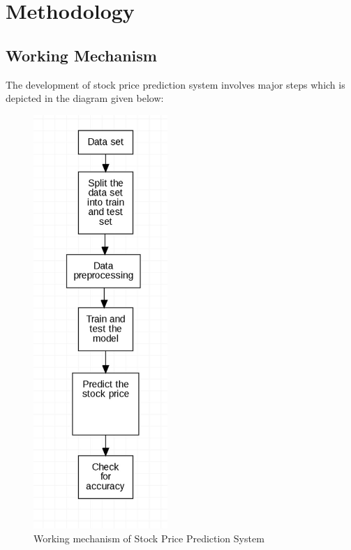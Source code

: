 \chapter{Methodology}
\vspace{-18pt}
  \section{Working Mechanism}
  \vspace{-18pt}
The development of stock price prediction system involves major steps which is 
depicted in the diagram given below:
\begin{figure}[tbh] %
\begin{center}
	\includegraphics[width=2in]{images/wm.jpg} 
	\caption{Working mechanism of Stock Price Prediction System} %
	\label{Working mechanism of Stock Price Prediction System} %
\end{center}
\end{figure}
